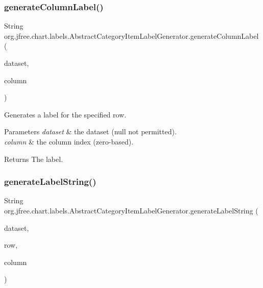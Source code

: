\subsubsection{\texorpdfstring{generate\+Column\+Label()}{generateColumnLabel()}}
{\footnotesize\ttfamily String org.\+jfree.\+chart.\+labels.\+Abstract\+Category\+Item\+Label\+Generator.\+generate\+Column\+Label (\begin{DoxyParamCaption}\item[{\mbox{\hyperlink{interfaceorg_1_1jfree_1_1data_1_1category_1_1_category_dataset}{Category\+Dataset}}}]{dataset,  }\item[{int}]{column }\end{DoxyParamCaption})}

Generates a label for the specified row.


\begin{DoxyParams}{Parameters}
{\em dataset} & the dataset ({\ttfamily null} not permitted). \\
\hline
{\em column} & the column index (zero-\/based).\\
\hline
\end{DoxyParams}
\begin{DoxyReturn}{Returns}
The label. 
\end{DoxyReturn}
\mbox{\label{classorg_1_1jfree_1_1chart_1_1labels_1_1_abstract_category_item_label_generator_a4860a2f577cf4bc44cb9c4bc447c8846}} 
\subsubsection{\texorpdfstring{generate\+Label\+String()}{generateLabelString()}}
{\footnotesize\ttfamily String org.\+jfree.\+chart.\+labels.\+Abstract\+Category\+Item\+Label\+Generator.\+generate\+Label\+String (\begin{DoxyParamCaption}\item[{\mbox{\hyperlink{interfaceorg_1_1jfree_1_1data_1_1category_1_1_category_dataset}{Category\+Dataset}}}]{dataset,  }\item[{int}]{row,  }\item[{int}]{column }\end{DoxyParamCaption})\hspace{0.3cm}{\ttfamily [protected]}}

